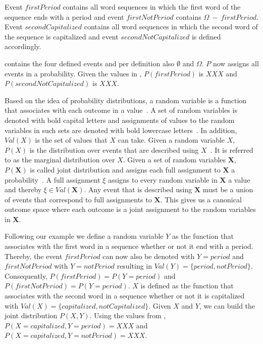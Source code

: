 Event $firstPeriod$ contains all word sequences in which the first word of the sequence ends with a period and event $firstNotPeriod$ contains $\Omega\ -\ firstPeriod$.
Event $secondCapitalized$ contains all word sequences in which the second word of the sequence is capitalized and event $secondNotCapitalized$ is defined accordingly.

 contains the four defined events and per definition also $\emptyset$ and $\Omega$.
$P$ now assigns all events in  a probability.
Given the values in , $P(firstPeriod)$ is $XXX$ and $P(secondNotCapitalized)$ is $XXX$.

\bigskip

Based on the idea of \glspl{probability distribution}, a \gls{random variable} is a \gls{function} that associates with each outcome in  a value~\cite{koller2009probabilistic}.
A set of \glspl{random variable} is denoted with bold capital letters and assignments of values to the \glspl{random variable} in such sets are denoted with bold lowercase letters~\cite{koller2009probabilistic}.
In addition, $Val(X)$ is the set of values that $X$ can take.
Given a \gls{random variable} $X$, $P(X)$ is the distribution over \glspl{event} that are described using $X$~\cite{koller2009probabilistic}.
It is referred to as the \gls{marginal distribution} over $X$.
Given a set of \glspl{random variable} $\bm{X}$, $P(\bm{X})$ is called \gls{joint distribution} and assigns each \gls{full assignment} to $\bm{X}$ a probability~\cite{koller2009probabilistic}.
A \gls{full assignment} $\xi$ assigns to every \gls{random variable} in $\bm{X}$ a value and thereby $\xi\in Val(\bm{X})$.
Any \gls{event} that is described using $\bm{X}$ must be a union of events that correspond to \glspl{full assignment} to $\bm{X}$.
This gives us a \gls{canonical outcome space} where each outcome is a joint assignment to the \glspl{random variable} in $\bm{X}$.

Following our example we define a \gls{random variable} $Y$ as the \gls{function} that associates with the first word in a sequence whether or not it end with a period.
Thereby, the \gls{event} $firstPeriod$ can now also be denoted with $Y = period$ and $firstNotPeriod$ with $Y = notPeriod$ resulting in $Val(Y)=\{period, notPeriod\}$.
Consequently, $P(firstPeriod)=P(Y=period)$ and $P(firstNotPeriod)=P(Y=period)$.
$X$ is defined as the function that associates with the second word in a sequence whether or not it is capitalized with $Val(X)=\{capitalized, notCapitalized\}$.
Given $X$ and $Y$, we can build the \gls{joint distribution} $P(X,Y)$.
Using the values from , $P(X=capitalized,Y=period)=XXX$ and $P(X=capitalized,Y=notPeriod)=XXX$.


